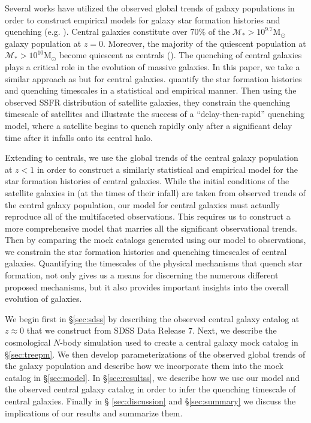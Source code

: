 \documentclass[iop,apj,tighten,twocolappendix,numberedappendix]{emulateapj}
\begin{document}
Several works have utilized the observed global trends of galaxy 
populations in order to construct empirical models for galaxy star 
formation histories and quenching (e.g. \citealt{Wetzel:2013aa, 
Schawinski:2014aa, Smethurst:2015aa}).
Central galaxies constitute over $70\%$ of the 
$\mathcal{M}_* > 10^{9.7}\mathrm{M}_\odot$ galaxy population at $z = 0$. 
Moreover, the majority of the quiescent population at  
$\mathcal{M}_* > 10^{10}\mathrm{M}_\odot$ become quiescent as 
centrals (\citealt{Wetzel:2013aa}). The quenching of central 
galaxies plays a critical role in the evolution of massive galaxies. 
In this paper, we take a similar approach as \cite{Wetzel:2013aa} but 
for central galaxies. 
\cite{Wetzel:2013aa}
quantify the star formation histories and quenching timescales in 
a statistical and empirical manner. Then using the observed SSFR 
distribution of satellite galaxies, they constrain the quenching 
timescale of satellites and illustrate the success 
of a ``delay-then-rapid'' quenching model, where a satellite begins
to quench rapidly only after a significant delay time after it 
infalls onto its central halo.

Extending to centrals, we use the global trends of 
the central galaxy population at $z < 1$ in order 
to construct a similarly statistical and empirical model for the star 
formation histories of central galaxies. While the initial conditions 
of the satellite galaxies in \cite{Wetzel:2013aa} (at the times
of their infall) are taken from observed trends of the central 
galaxy population, 
our model for central galaxies must actually reproduce all of the 
multifaceted observations. This requires us to construct
a more comprehensive model that marries all the significant 
observational trends. Then by comparing the mock 
catalogs generated using our model to observations, we constrain 
the star formation histories and quenching timescales of central galaxies. 
Quantifying the timescales of the physical mechanisms that quench 
star formation, not only gives us a means for discerning the numerous
different proposed mechanisms, but it also provides important insights 
into the overall evolution of galaxies. 

We begin first in \S \ref{sec:sdss} by describing the observed 
central galaxy catalog at $z \approx 0$ that we construct from 
SDSS Data Release 7. Next, we describe the cosmological $N$-body simulation 
used to create a central galaxy mock catalog in \S \ref{sec:treepm}. 
We then develop parameterizations of the observed global trends of the
galaxy population and describe how we incorporate them into the mock catalog
in \S \ref{sec:model}. In \S \ref{sec:resultss}, we describe
how we use our model and the observed central galaxy catalog in order to 
infer the quenching timescale of central galaxies. Finally in \S
\ref{sec:discussion} and \S \ref{sec:summary} we discuss the implications of
our results and summarize them. 
\end{document}
